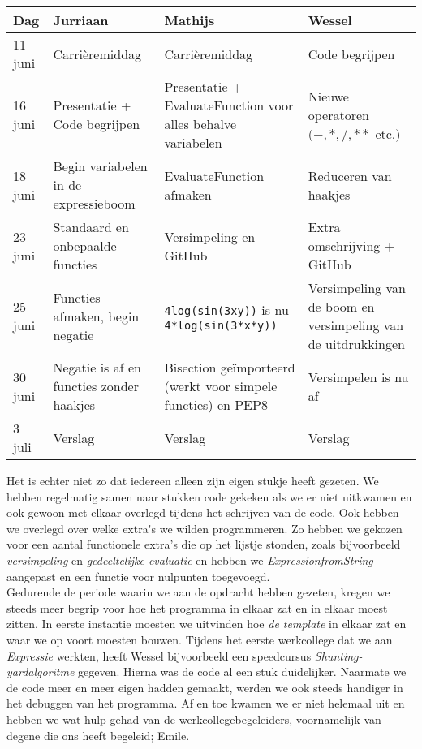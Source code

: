 \documentclass[12pt]{article}
\begin{document}
\begin{center}
    \begin{tabular}{ | l | p{4cm}  | p{4cm} | p{4cm} |}
    \hline
    Dag & Jurriaan & Mathijs & Wessel \\ \hline
    11 juni & Carri\`eremiddag & Carri\`eremiddag & Code begrijpen \\ \hline
    16 juni & Presentatie + Code begrijpen & Presentatie + EvaluateFunction voor alles behalve variabelen & Nieuwe operatoren  $(-, *, /, **$ etc.$)$ \\ \hline
    18 juni & Begin variabelen in de expressieboom & EvaluateFunction afmaken & Reduceren van haakjes \\ \hline
    23 juni & Standaard en onbepaalde functies & Versimpeling en GitHub & Extra omschrijving + GitHub \\ \hline
    25 juni & Functies afmaken, begin negatie & \texttt{4log(sin(3xy))} is nu \texttt{4*log(sin(3*x*y))} & Versimpeling van de boom en versimpeling van de uitdrukkingen \\ \hline
    30 juni & Negatie is af en functies zonder haakjes & Bisection ge\"{i}mporteerd (werkt voor simpele functies) en PEP8 & Versimpelen is nu af \\ \hline
    3 juli & Verslag & Verslag & Verslag \\
    \hline
    \end{tabular}
\end{center}
Het is echter niet zo dat iedereen alleen zijn eigen stukje heeft gezeten. We hebben regelmatig samen naar stukken code gekeken als we er niet uitkwamen en ook gewoon met elkaar overlegd tijdens het schrijven van de code. Ook hebben we overlegd over welke extra\'{}s we wilden programmeren. Zo hebben we gekozen voor een aantal functionele extra's{} die op het lijstje stonden, zoals bijvoorbeeld \textit{versimpeling} en \textit{gedeeltelijke evaluatie} en hebben we \textit{ExpressionfromString} aangepast en een functie voor nulpunten toegevoegd. \\
Gedurende de periode waarin we aan de opdracht hebben gezeten, kregen we steeds meer begrip voor hoe het programma in elkaar zat en in elkaar moest zitten. In eerste instantie moesten we uitvinden hoe \textit{de template} in elkaar zat en waar we op voort moesten bouwen. Tijdens het eerste werkcollege dat we aan \textit{Expressie} werkten, heeft Wessel bijvoorbeeld een speedcursus \textit{Shunting-yardalgoritme} gegeven. Hierna was de code al een stuk duidelijker. Naarmate we de code meer en meer eigen hadden gemaakt, werden we ook steeds handiger in het debuggen van het programma. Af en toe kwamen we er niet helemaal uit en hebben we wat hulp gehad van de werkcollegebegeleiders, voornamelijk van degene die ons heeft begeleid; Emile. \\
\end{document}
